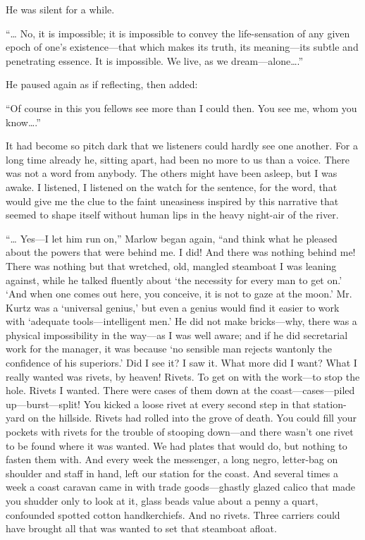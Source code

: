 \documentclass[12pt]{report}
\begin{document}
He was silent for a while.

``\ldots{} No, it is impossible; it is impossible to convey the
life-sensation of any given epoch of one's existence---that which makes
its truth, its meaning---its subtle and penetrating essence. It is
impossible. We live, as we dream---alone\ldots{}.''

He paused again as if reflecting, then added:

``Of course in this you fellows see more than I could then. You see me,
whom you know\ldots{}.''

It had become so pitch dark that we listeners could hardly see one
another. For a long time already he, sitting apart, had been no more to
us than a voice. There was not a word from anybody. The others might
have been asleep, but I was awake. I listened, I listened on the watch
for the sentence, for the word, that would give me the clue to the faint
uneasiness inspired by this narrative that seemed to shape itself
without human lips in the heavy night-air of the river.

``\ldots{} Yes---I let him run on,'' Marlow began again, ``and think
what he pleased about the powers that were behind me. I did! And there
was nothing behind me! There was nothing but that wretched, old, mangled
steamboat I was leaning against, while he talked fluently about `the
necessity for every man to get on.' `And when one comes out here, you
conceive, it is not to gaze at the moon.' Mr. Kurtz was a `universal
genius,' but even a genius would find it easier to work with `adequate
tools---intelligent men.' He did not make bricks---why, there was a
physical impossibility in the way---as I was well aware; and if he did
secretarial work for the manager, it was because `no sensible man
rejects wantonly the confidence of his superiors.' Did I see it? I saw
it. What more did I want? What I really wanted was rivets, by heaven!
Rivets. To get on with the work---to stop the hole. Rivets I wanted.
There were cases of them down at the coast---cases---piled
up---burst---split! You kicked a loose rivet at every second step in
that station-yard on the hillside. Rivets had rolled into the grove of
death. You could fill your pockets with rivets for the trouble of
stooping down---and there wasn't one rivet to be found where it was
wanted. We had plates that would do, but nothing to fasten them with.
And every week the messenger, a long negro, letter-bag on shoulder and
staff in hand, left our station for the coast. And several times a week
a coast caravan came in with trade goods---ghastly glazed calico that
made you shudder only to look at it, glass beads value about a penny a
quart, confounded spotted cotton handkerchiefs. And no rivets. Three
carriers could have brought all that was wanted to set that steamboat
afloat.
\end{document}
